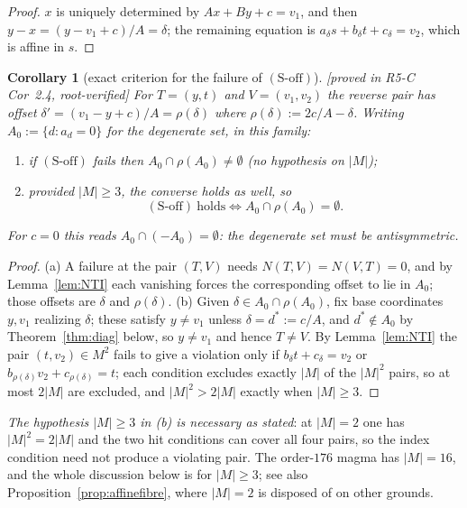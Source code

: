 \documentclass[11pt]{article}
\theoremstyle{plain}
\newtheorem{corollary}[theorem]{Corollary}
\theoremstyle{definition}
\theoremstyle{remark}
\numberwithin{equation}{section}
\newcommand{\statusbox}[1]{{\small\sloppy\textsf{[#1]}}}
\newcommand{\PROVED}[1]{\statusbox{proved in #1, root-verified}}
\begin{document}
\begin{proof}
$x$ is uniquely determined by $Ax+By+c = v_1$, and then
$y-x = (y-v_1+c)/A = \delta$; the remaining equation is $a_\delta s + b_\delta t + c_\delta = v_2$,
which is affine in $s$.
\end{proof}

\begin{corollary}[exact criterion for the failure of $(\mathrm{S\text{-}off})$]\label{cor:soffcrit}
\PROVED{R5-C Cor~2.4}
For $T = (y,t)$ and $V = (v_1,v_2)$ the reverse pair has offset
$\delta' = (v_1-y+c)/A = \rho(\delta)$ where $\rho(\delta) := 2c/A - \delta$. Writing
$A_0 := \{d : a_d = 0\}$ for the \emph{degenerate set}, in this family:
\begin{enumerate}
\item[(a)] if $(\mathrm{S\text{-}off})$ fails then $A_0\cap\rho(A_0)\ne\emptyset$ (no
hypothesis on $|M|$);
\item[(b)] \emph{provided $|M|\ge 3$}, the converse holds as well, so
\[
  (\mathrm{S\text{-}off}) \ \text{holds} \iff A_0\cap\rho(A_0) = \emptyset .
\]
\end{enumerate}
For $c=0$ this reads $A_0\cap(-A_0) = \emptyset$: the degenerate set must be antisymmetric.
\end{corollary}

\begin{proof}
(a) A failure at the pair $(T,V)$ needs $N(T,V) = N(V,T) = 0$, and by Lemma~\ref{lem:NTI}
each vanishing forces the corresponding offset to lie in $A_0$; those offsets are $\delta$
and $\rho(\delta)$.
(b) Given $\delta\in A_0\cap\rho(A_0)$, fix base coordinates $y,v_1$ realizing $\delta$;
these satisfy $y\ne v_1$ unless $\delta = d^{*} := c/A$, and $d^{*}\notin A_0$ by
Theorem~\ref{thm:diag} below, so $y\ne v_1$ and hence $T\ne V$. By
Lemma~\ref{lem:NTI} the pair $(t,v_2)\in M^2$ fails to give a violation only if
$b_\delta t + c_\delta = v_2$ or $b_{\rho(\delta)}v_2 + c_{\rho(\delta)} = t$; each condition
excludes exactly $|M|$ of the $|M|^2$ pairs, so at most $2|M|$ are excluded, and
$|M|^2 > 2|M|$ exactly when $|M|\ge 3$.
\end{proof}

\emph{The hypothesis $|M|\ge3$ in (b) is necessary as stated}: at $|M|=2$ one has
$|M|^2 = 2|M|$ and the two hit conditions can cover all four pairs, so the index condition
need not produce a violating pair. The order-$176$ magma has $|M| = 16$, and the whole
discussion below is for $|M|\ge 3$; see also Proposition~\ref{prop:affinefibre}, where
$|M|=2$ is disposed of on other grounds.
\end{document}
